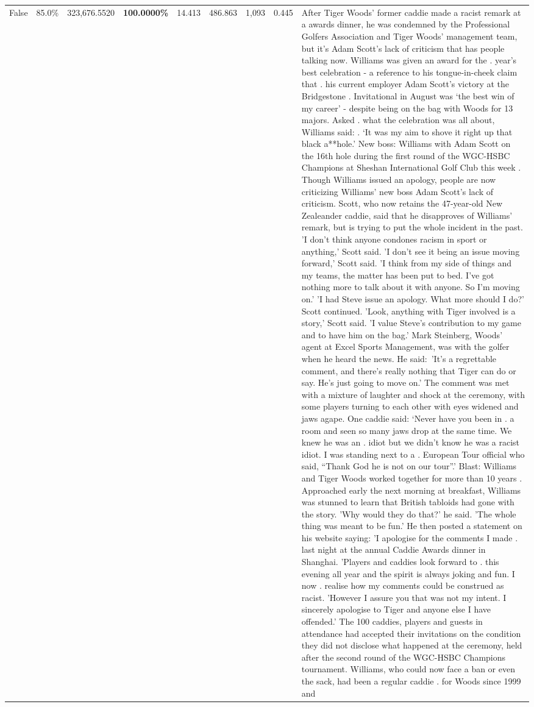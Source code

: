 \begin{table}[H]
\begin{tabular}{lllrlllll}
False & 85.0\% & 323,676.5520 & \bfseries \color{red} 100.0000\% & 14.413 & 486.863 & 1,093 & 0.445 & After Tiger Woods' former caddie made a racist remark at a awards dinner, he was condemned by the Professional Golfers Association and Tiger Woods' management team, but it's Adam Scott's lack of criticism that has people talking now. Williams was given an award for the . year’s best celebration - a reference to his tongue-in-cheek claim that . his current employer Adam Scott’s victory at the Bridgestone . Invitational in August was ‘the best win of my career’ - despite being on the bag with Woods for 13 majors. Asked . what the celebration was all about, Williams said: . ‘It was my aim to shove it right up that black a**hole.’ New boss: Williams with Adam Scott  on the 16th hole during the first round of the WGC-HSBC Champions at Sheshan International Golf Club this week . Though Williams issued an apology, people are now criticizing Williams' new boss Adam Scott's lack of criticism. Scott, who now retains the 47-year-old New Zealeander caddie, said that he disapproves of Williams' remark, but is trying to put the whole incident in the past. 'I don't think anyone condones racism in sport or anything,' Scott said. 'I don't see it being an issue moving forward,' Scott said. 'I think from my side of things and my teams, the matter has been put to bed. I've got nothing more to talk about it with anyone. So I'm moving on.' 'I had Steve issue an apology. What more should I do?' Scott continued. 'Look, anything with Tiger involved is a story,' Scott said. 'I value Steve's contribution to my game and to have him on the bag.' Mark Steinberg, Woods' agent at Excel Sports Management, was with the golfer when he heard the news. He said: 'It's a regrettable comment, and there's really nothing that Tiger can do or say. He's just going to move on.' The comment was met with a mixture of laughter and shock at the ceremony, with some players turning to each other with eyes widened and jaws agape. One caddie said: ‘Never have you been in . a room and seen so many jaws drop at the same time. We knew he was an . idiot but we didn’t know he was a racist idiot. I was standing next to a . European Tour official who said, “Thank God he is not on our tour”.’ Blast: Williams and Tiger Woods worked together for more than 10 years . Approached early the next morning at breakfast, Williams was stunned to learn that British tabloids had gone with the story. 'Why would they do that?' he said. 'The whole thing was meant to be fun.' He then posted a statement on his website saying: 'I apologise for the comments I made . last night at the annual Caddie Awards dinner in Shanghai. 'Players and caddies look forward to . this evening all year and the spirit is always joking and fun. I now . realise how my comments could be construed as racist. 'However I assure you that was not my intent. I sincerely apologise to Tiger and anyone else I have offended.' The 100 caddies, players and guests in attendance had accepted their invitations on the condition they did not disclose what happened at the ceremony, held after the second round of the WGC-HSBC Champions tournament. Williams, who could now face a ban or even the sack, had been a regular caddie . for Woods since 1999 and 
\end{tabular}
\end{table}
